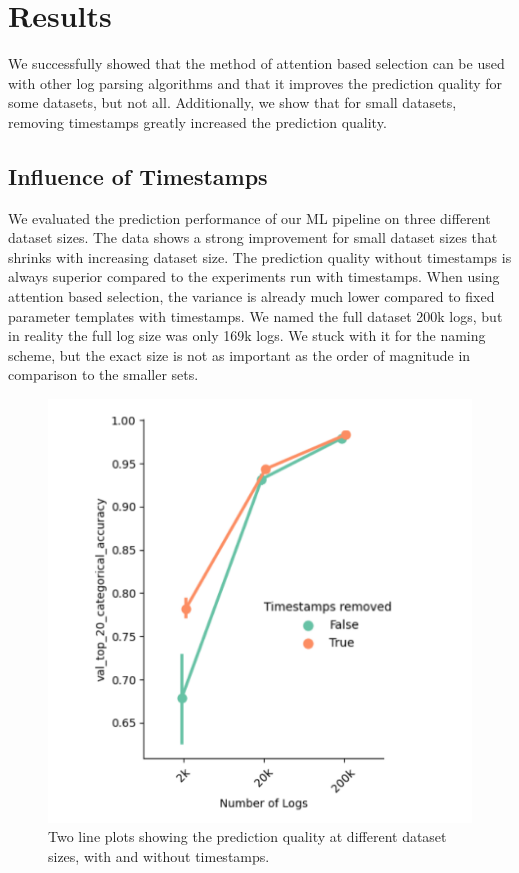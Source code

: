 \chapter{Results}
\label{ch:Results}
We successfully showed that the method of attention based selection can be used with other log parsing algorithms and that it improves the prediction quality for some datasets, but not all. Additionally, we show that for small datasets, removing timestamps greatly increased the prediction quality. 

\section{Influence of Timestamps}
\label{sec:Results:Timestamps}
We evaluated the prediction performance of our ML pipeline on three different dataset sizes. The data shows a strong improvement for small dataset sizes that shrinks with increasing dataset size. The prediction quality without timestamps is always superior compared to the experiments run with timestamps. When using attention based selection, the variance is already much lower compared to fixed parameter templates with timestamps. We named the full dataset 200k logs, but in reality the full log size was only 169k logs. We stuck with it for the naming scheme, but the exact size is not as important as the order of magnitude in comparison to the smaller sets. 

\begin{figure}[H]
    \centering
    \includegraphics[keepaspectratio=true,scale=0.8]{figures/5_results/timestamps_comparison.png}
    \caption{Two line plots showing the prediction quality at different dataset sizes, with and without timestamps.}
    \label{fig:TimestampsComparison}
\end{figure}

